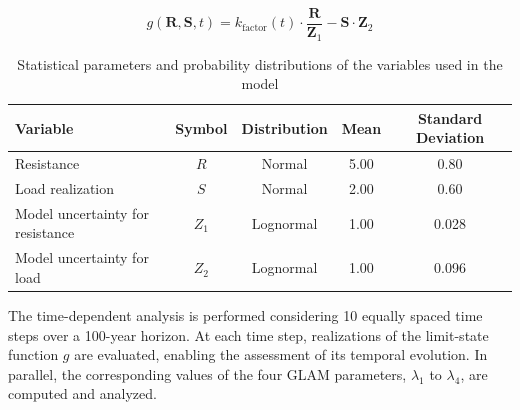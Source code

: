 \begin{equation}
g(\textbf{R}, \textbf{S}, t) = k_{\text{factor}}(t) \cdot \frac{\textbf{R}}{\textbf{Z}_1} - \textbf{S} \cdot \textbf{Z}_2
\label{eq:toy_problem_equation}
\end{equation}

\begin{table}[H]
\centering
\caption{Statistical parameters and probability distributions of the variables used in the model}
\label{tab:random_variables_parameters}
\begin{tabular}{l c c c c}
\hline
\textbf{Variable} & \textbf{Symbol} & \textbf{Distribution} & \textbf{Mean} & \textbf{Standard Deviation} \\
\hline
Resistance      & $R$     & Normal      & 5.00 & 0.80  \\
Load realization            & $S$     & Normal      & 2.00 & 0.60  \\
Model uncertainty for resistance  & $Z_1$   & Lognormal  & 1.00 & 0.028 \\
Model uncertainty for load & $Z_2$   & Lognormal  & 1.00 & 0.096 \\
\hline
\end{tabular}
\end{table}

The time-dependent analysis is performed considering 10 equally spaced time steps over a 100-year horizon. At each time step, realizations of the limit-state function $g$ are evaluated, enabling the assessment of its temporal evolution. In parallel, the corresponding values of the four GLAM parameters, $\lambda_1$ to $\lambda_4$, are computed and analyzed.

